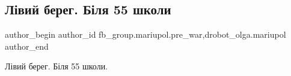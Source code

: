  
 
 
 
 

\subsection{Лівий берег. Біля 55 школи}
\label{sec:08_02_2023.fb.fb_group.mariupol.pre_war.2.l_vii_bereg__b_lya_5}
 
\ifcmt
 author_begin
   author_id fb_group.mariupol.pre_war,drobot_olga.mariupol
 author_end
\fi

Лівий берег. Біля 55 школи.

